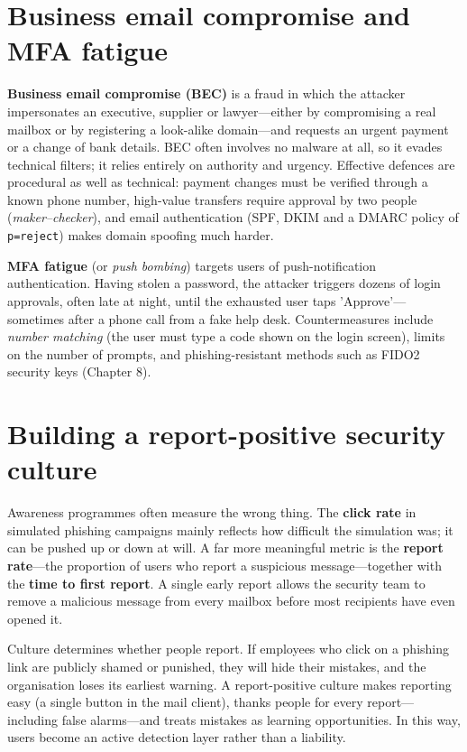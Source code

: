 \section{Business email compromise and MFA fatigue}\label{sec:5.5}
\textbf{Business email compromise (BEC)} is a fraud in which the attacker impersonates an executive, supplier or lawyer—either by compromising a real mailbox or by registering a look-alike domain—and requests an urgent payment or a change of bank details. BEC often involves no malware at all, so it evades technical filters; it relies entirely on authority and urgency. Effective defences are procedural as well as technical: payment changes must be verified through a known phone number, high-value transfers require approval by two people (\emph{maker–checker}), and email authentication (SPF, DKIM and a DMARC policy of \texttt{p=reject}) makes domain spoofing much harder.

\textbf{MFA fatigue} (or \emph{push bombing}) targets users of push-notification authentication. Having stolen a password, the attacker triggers dozens of login approvals, often late at night, until the exhausted user taps 'Approve'—sometimes after a phone call from a fake help desk. Countermeasures include \emph{number matching} (the user must type a code shown on the login screen), limits on the number of prompts, and phishing-resistant methods such as FIDO2 security keys (Chapter 8).

\section{Building a report-positive security culture}\label{sec:5.6}
Awareness programmes often measure the wrong thing. The \textbf{click rate} in simulated phishing campaigns mainly reflects how difficult the simulation was; it can be pushed up or down at will. A far more meaningful metric is the \textbf{report rate}—the proportion of users who report a suspicious message—together with the \textbf{time to first report}. A single early report allows the security team to remove a malicious message from every mailbox before most recipients have even opened it.

Culture determines whether people report. If employees who click on a phishing link are publicly shamed or punished, they will hide their mistakes, and the organisation loses its earliest warning. A report-positive culture makes reporting easy (a single button in the mail client), thanks people for every report—including false alarms—and treats mistakes as learning opportunities. In this way, users become an active detection layer rather than a liability.

